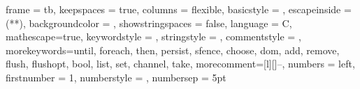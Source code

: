 
\newcommand{\threads}{T}

\newcommand{\astate}{\sigma}
\newcommand{\allstates}{\Sigma}
\newcommand{\compstep}{\mathtt{cmp}}
\newcommand{\envstep}{\mathtt{env}}
\newcommand{\memstep}{\mathtt{mem}}

\newcommand{\last}{\mathsf{last}}

\newcommand{\wf}{\mathsf{wf}}
\newcommand{\strongpost}{\mathit{sp}}
\newcommand{\cmdaux}{\cmd^{\mathit{aux}}} 
\newcommand{\bexp}{\mathit{b}}
\newcommand{\rem}[2]{\mathit{rem}(#1,#2)} 
\newcommand{\prop}{{P}}
\newcommand{\relation}{{R}}
\newcommand{\program}{{prog}}
\newcommand{\id}{{id}}


\newcommand{\assert}[1]{{\color{blue}{\ensuremath{\left\{
    \begin{array}[c]{@{}l@{}}
      #1
    \end{array}
  \right\}}}}}


\newcommand*{\mycommentstyle}[1]{%
  \begingroup
    \color{teal}
    \rmfamily%
    \itshape%
    \lstset{columns=fullflexible}%
    #1%
  \endgroup
}

\newcommand{\lineno}[1]{line~\ref{#1}}
\newcommand{\linenos}[2]{lines~\ref{#1}--\ref{#2}}

\lstset
{
    frame            = tb, %
    keepspaces       = true,
    columns          = flexible,
    basicstyle       = {\linespread{0.9}\ttfamily\footnotesize},
    escapeinside     = {(*}{*)}, %
    backgroundcolor  = \color{codebackground},
    showstringspaces = false,
    language         = C,
    mathescape=true,
    keywordstyle     = {\bfseries\color{blue}},
    stringstyle      = {\bfseries\color{red}},
    commentstyle     = {\lst@column@fullflexible\color{teal}\footnotesize},
    morekeywords={until, foreach, then, persist, sfence, choose, dom, add, remove, flush, flushopt, bool, list, set, channel, take},
    morecomment=[l][\lst@column@fullflexible\color{teal}\footnotesize]{--},
    numbers          = left, %
    firstnumber      = 1,
    numberstyle      = \scriptsize\color{black},
    numbersep        = 5pt
}




\newcommand{\intelname}{\text{Intel-\lowercase{x}86}\xspace}
\newcommand{\oldptso}{\text{PTSO}\xspace}
\newcommand{\xes}{\text{\lowercase{x}86}\xspace}
\newcommand{\TSO}{\text{\xes-TSO}\xspace}
\newcommand{\manname}{man}
\newcommand{\simname}{sim}
\newcommand{\cpxes}{\text{P\lowercase{x}86}\xspace}
\newcommand{\pxes}{\ensuremath{\cpxes_{\text{\manname}}}\xspace}
\newcommand{\spxes}{\ensuremath{\cpxes_{\text{\simname}}}\xspace}
\newcommand{\reccontext}{\ensuremath{\Delta}}


